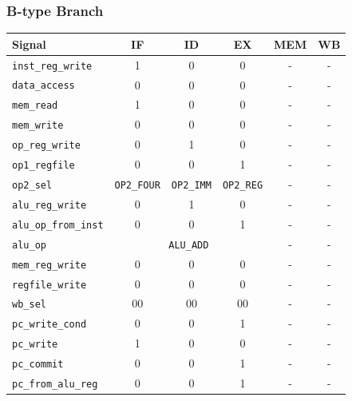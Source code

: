 \documentclass{scrartcl}
\begin{document}
\subsubsection{B-type Branch}
\begin{tabularx}{\textwidth}{ | X | c | c | c | c | c | }
  \hline
  \textbf{Signal} & \textbf{IF} & \textbf{ID} & \textbf{EX} & \textbf{MEM} & \textbf{WB} \\ \hline
  \texttt{inst\_reg\_write} & 1 & 0 & 0 & - & - \\ \hline
  \texttt{data\_access} & 0 & 0 & 0 & - & - \\ \hline
  \texttt{mem\_read} & 1 & 0 & 0 & - & - \\ \hline
  \texttt{mem\_write} & 0 & 0 & 0 & - & - \\ \hline
  \texttt{op\_reg\_write} & 0 & 1 & 0 & - & - \\ \hline
  \texttt{op1\_regfile} & 0 & 0 & 1 & - & - \\ \hline
  \texttt{op2\_sel} & \texttt{OP2\_FOUR} & \texttt{OP2\_IMM} & \texttt{OP2\_REG} & - & - \\ \hline
  \texttt{alu\_reg\_write} & 0 & 1 & 0 & - & - \\ \hline
  \texttt{alu\_op\_from\_inst} & 0 & 0 & 1 & - & - \\ \hline
  \texttt{alu\_op} & \multicolumn{3}{c|}{\texttt{ALU\_ADD}} & - & - \\ \hline
  \texttt{mem\_reg\_write} & 0 & 0 & 0 & - & - \\ \hline
  \texttt{regfile\_write} & 0 & 0 & 0 & - & - \\ \hline
  \texttt{wb\_sel} & 00 & 00 & 00 & - & - \\ \hline
  \texttt{pc\_write\_cond} & 0 & 0 & 1 & - & - \\ \hline
  \texttt{pc\_write} & 1 & 0 & 0 & - & - \\ \hline
  \texttt{pc\_commit} & 0 & 0 & 1 & - & - \\ \hline
  \texttt{pc\_from\_alu\_reg} & 0 & 0 & 1 & - & - \\ \hline
\end{tabularx}
\end{document}

